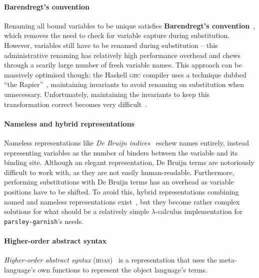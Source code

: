 \documentclass[../../main.tex]{subfiles}
\begin{document}
\paragraph{Barendregt's convention}
Renaming all bound variables to be unique satisfies \textbf{Barendregt's convention}~\cite{barendregt_lambda_1984}, which removes the need to check for variable capture during substitution.
However, variables still have to be renamed during substitution -- this administrative renaming has relatively high performance overhead and chews through a scarily large number of fresh variable names.
This approach can be massively optimised though: the Haskell \textsc{ghc} compiler uses a technique dubbed ``the Rapier''~\cite{peytonjones_secrets_2002}, maintaining invariants to avoid renaming on substitution when unnecessary.
Unfortunately, maintaining the invariants to keep this transformation correct becomes very difficult~\cite{maclaurin_thefoil_2023}.

\paragraph{Nameless and hybrid representations}
Nameless representations like \emph{De Bruijn indices}~\cite{debruijn_lambda_1972} eschew names entirely, instead representing variables as the number of binders between the variable and its binding site.
Although an elegant representation, De Bruijn terms are notoriously difficult to work with, as they are not easily human-readable.
Furthermore, performing substitutions with De Bruijn terms has an overhead as variable positions have to be shifted.
To avoid this, hybrid representations combining named and nameless representations exist~\cite{mcbride_imnotanumber_2004,chargueraud_locally_2012}, but they become rather complex solutions for what should be a relatively simple $\lambda$-calculus implementation for \texttt{parsley-garnish}'s needs.

\paragraph{Higher-order abstract syntax}
\emph{Higher-order abstract syntax} (\textsc{hoas})~\cite{pfenning_hoas_1988} is a representation that uses the meta-language's own functions to represent the object language's terms.
\end{document}

